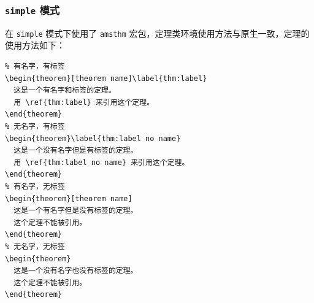 \documentclass[lang=cn,newtx,10pt,scheme=chinese]{elegantbook}
\begin{document}
\subsubsection{\texttt{simple} 模式}

在 \lstinline{simple} 模式下使用了 \lstinline{amsthm} 宏包，定理类环境使用方法与原生一致，定理的使用方法如下：

\begin{lstlisting}
% 有名字，有标签
\begin{theorem}[theorem name]\label{thm:label}
  这是一个有名字和标签的定理。
  用 \ref{thm:label} 来引用这个定理。
\end{theorem}
% 无名字，有标签
\begin{theorem}\label{thm:label no name}
  这是一个没有名字但是有标签的定理。
  用 \ref{thm:label no name} 来引用这个定理。
\end{theorem}
% 有名字，无标签
\begin{theorem}[theorem name]
  这是一个有名字但是没有标签的定理。
  这个定理不能被引用。
\end{theorem}
% 无名字，无标签
\begin{theorem}
  这是一个没有名字也没有标签的定理。
  这个定理不能被引用。
\end{theorem}
\end{lstlisting}


\end{document}

